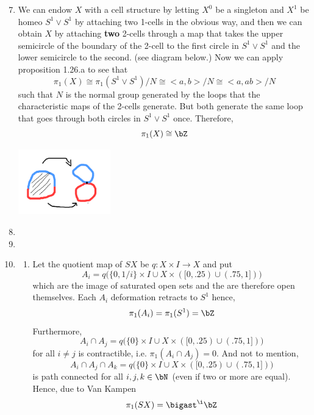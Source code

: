 \documentclass{pset}
\begin{document}
\maketitle

\pagebreak 

\begin{problem}
    \begin{enumerate}[label=1.2.\arabic*]
        \setcounter{enumi}{6}
        \item We can endow $X$ with a cell structure by letting $X^0$ be a singleton and $X^1$ be homeo $S^1 \vee S^1$ by attaching two 1-cells in the obvious way, and then we can obtain $X$ by attaching \textbf{two} 2-cells through a map that takes the upper semicircle of the boundary of the 2-cell to the first circle in $S^1 \vee S^1$ and the lower semicircle to the second. (see diagram below.) Now we can apply proposition 1.26.a to see that
        \[\pi_1(X) \cong \pi_1(S^1 \vee S^1)/N \cong <a, b>/N \cong <a, ab>/N\]
        such that $N$ is the normal group generated by the loops that the characteristic maps of the 2-cells generate. But both generate the same loop that goes through both circles in $S^1 \vee S^1$ once. Therefore,
        \[\pi_1(X) \cong \bZ\]
        
        \includegraphics[width=4cm]{cell attachment.png}
        \setcounter{enumi}{8}
        \item 

        \setcounter{enumi}{16}
        \item 
        \item \begin{enumerate}[label=(\alph*)]
            \item Let the quotient map of $SX$ be $q\colon X\times I \longrightarrow X$ and put 
            \[A_i = q\bigl(\{0, 1/i\} \times I \cup X\times ([0, .25) \cup (.75, 1])\bigr)\]
            which are the image of saturated open sets and the are therefore open themselves. Each $A_i$ deformation retracts to $S^1$ hence,
            \[\pi_1(A_i) = \pi_1(S^1) = \bZ\]
            Furthermore, 
            \[A_i \cap A_j = q\bigl(\{0\} \times I \cup X \times ([0, .25) \cup (.75, 1])\bigr)\]
            for all $i \neq j$ is contractible, i.e. $\pi_1(A_i \cap A_j)=0$. And not to mention,
            \[A_i \cap A_j \cap A_k = q\bigl(\{0\} \times I \cup X \times ([0, .25) \cup (.75, 1])\bigr)\]
            is path connected for all $i,j,k\in\bN$ (even if two or more are equal). Hence, due to Van Kampen
            \[\pi_1(SX) = \bigast^\i \bZ\]
        \end{enumerate}
    \end{enumerate}
\end{problem}
\end{document}
